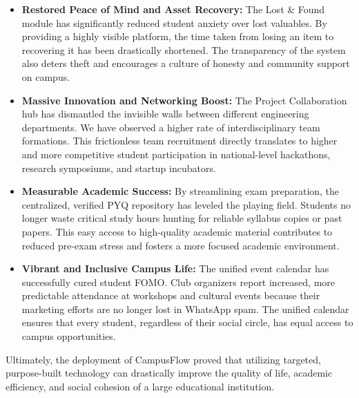 \begin{itemize}
    \item \textbf{Restored Peace of Mind and Asset Recovery:} The Lost \& Found module has significantly reduced student anxiety over lost valuables. By providing a highly visible platform, the time taken from losing an item to recovering it has been drastically shortened. The transparency of the system also deters theft and encourages a culture of honesty and community support on campus.
    
    \item \textbf{Massive Innovation and Networking Boost:} The Project Collaboration hub has dismantled the invisible walls between different engineering departments. We have observed a higher rate of interdisciplinary team formations. This frictionless team recruitment directly translates to higher and more competitive student participation in national-level hackathons, research symposiums, and startup incubators.
    
    \item \textbf{Measurable Academic Success:} By streamlining exam preparation, the centralized, verified PYQ repository has leveled the playing field. Students no longer waste critical study hours hunting for reliable syllabus copies or past papers. This easy access to high-quality academic material contributes to reduced pre-exam stress and fosters a more focused academic environment.
    
    \item \textbf{Vibrant and Inclusive Campus Life:} The unified event calendar has successfully cured student FOMO. Club organizers report increased, more predictable attendance at workshops and cultural events because their marketing efforts are no longer lost in WhatsApp spam. The unified calendar ensures that every student, regardless of their social circle, has equal access to campus opportunities.
\end{itemize}

Ultimately, the deployment of CampusFlow proved that utilizing targeted, purpose-built technology can drastically improve the quality of life, academic efficiency, and social cohesion of a large educational institution.